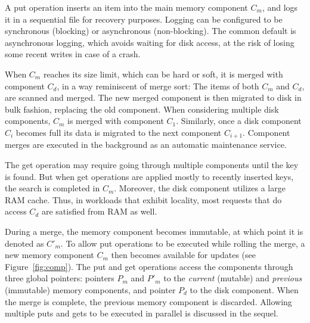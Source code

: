 A put operation inserts an item into the main memory
component $C_m$, and logs it in a sequential file for recovery
purposes. Logging can be configured to be synchronous (blocking) or asynchronous
(non-blocking). The common default is asynchronous logging, which avoids waiting
for disk access, at the risk of losing some recent writes in case of a crash.

When $C_m$ reaches its size limit, which can be hard or soft, it is merged with
component $C_d$, in a way reminiscent of merge sort: The items of both $C_{m}$ and $C_{d}$, %
are scanned and merged. %
The new merged component
is then migrated to disk in bulk fashion, replacing the old component.
When considering multiple
disk components, $C_m$ is merged with component $C_1$.
Similarly, once a disk component $C_{i}$ becomes full its data is migrated to the
next component $C_{i+1}$.
Component merges are
%
executed in the background as an automatic maintenance service.


The get operation may require going
through multiple components until the key is found. But when get operations are
applied mostly to recently inserted keys, the search is completed in $C_m$.
Moreover, the disk component utilizes a large RAM cache. Thus, in workloads
that exhibit locality, most requests that do access  $C_{d}$ are satisfied from RAM
as well.

During a merge, the memory component becomes immutable,
at which point it is denoted
as $C'_m$. To allow put operations to be executed while rolling the merge, a
 new memory component $C_m$ then becomes available for updates (see
Figure~\ref{fig:comp}).
The put and get operations access the
components through three global pointers: pointers $P_m$ and $P'_m$ to the
\emph{current} (mutable) and \emph{previous} (immutable) memory components, and
pointer $P_d$ to the disk component. When the merge is complete, the previous
memory component is discarded. Allowing multiple puts and gets to be executed
in parallel is discussed in the sequel.

